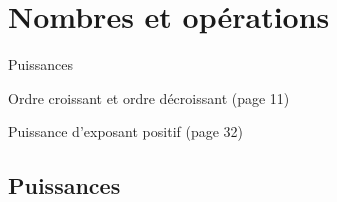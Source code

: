 \documentclass[a4paper,11pt]{report}
\begin{document}
\newcommand{\chapterName}{Nombres et opérations}
\newcommand{\serieName}{Puissances}


\chapter*{\chapterName}
\thispagestyle{empty}

\begin{amL}{\serieName}{
\item Ordre croissant et ordre décroissant (page 11)
\item Puissance d'exposant positif (page 32)
}
\end{amL}
\section*{\serieName}
\setcounter{page}{1}
\thispagestyle{firstPage}



\end{document}
